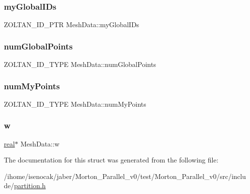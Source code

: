 \mbox{\label{structMeshData_a0120c5fdf85c35392a53e3b2cb7eb5e5}} 
\subsubsection{\texorpdfstring{my\+Global\+I\+Ds}{myGlobalIDs}}
{\footnotesize\ttfamily Z\+O\+L\+T\+A\+N\+\_\+\+I\+D\+\_\+\+P\+TR Mesh\+Data\+::my\+Global\+I\+Ds}

\mbox{\label{structMeshData_ad914c94084e0b65137af012fc9e917b4}} 
\subsubsection{\texorpdfstring{num\+Global\+Points}{numGlobalPoints}}
{\footnotesize\ttfamily Z\+O\+L\+T\+A\+N\+\_\+\+I\+D\+\_\+\+T\+Y\+PE Mesh\+Data\+::num\+Global\+Points}

\mbox{\label{structMeshData_ae5e258a70cdd92582ef565bf1d874f98}} 
\subsubsection{\texorpdfstring{num\+My\+Points}{numMyPoints}}
{\footnotesize\ttfamily Z\+O\+L\+T\+A\+N\+\_\+\+I\+D\+\_\+\+T\+Y\+PE Mesh\+Data\+::num\+My\+Points}

\mbox{\label{structMeshData_a7c848439c3b116ccc9968b69f44da17f}} 
\subsubsection{\texorpdfstring{w}{w}}
{\footnotesize\ttfamily \mbox{\hyperlink{definitions_8h_aedc0ad84d1e764530814f57ad931d02a}{real}}$\ast$ Mesh\+Data\+::w}



The documentation for this struct was generated from the following file\+:\begin{DoxyCompactItemize}
\item 
/ihome/isenocak/jaber/\+Morton\+\_\+\+Parallel\+\_\+v0/test/\+Morton\+\_\+\+Parallel\+\_\+v0/src/include/\mbox{\hyperlink{partition_8h}{partition.\+h}}\end{DoxyCompactItemize}
